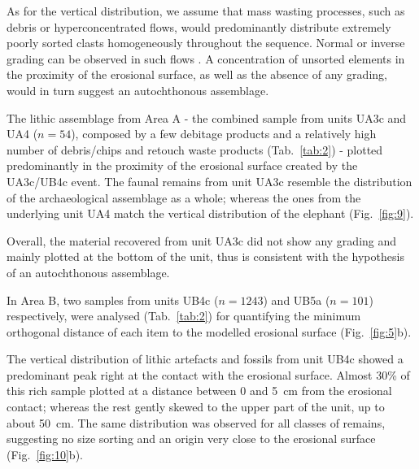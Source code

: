 \documentclass[preprint,authoryear,times]{elsarticle} %
\begin{document}

As for the vertical distribution, we assume that mass wasting processes, such as debris or hyperconcentrated flows, would predominantly distribute extremely poorly sorted clasts homogeneously throughout the sequence. Normal or inverse grading can be observed in such flows \citep{Pierson2005}. A concentration of unsorted elements in the proximity of the erosional surface, as well as the absence of any grading, would in turn suggest an autochthonous assemblage.


The lithic assemblage from Area A - the combined sample from units UA3c and UA4 ($n = 54$), composed by a few debitage products and a relatively high number of debris/chips and retouch waste products (Tab.~\ref{tab:2}) - plotted predominantly in the proximity of the erosional surface created by the UA3c/UB4c event. The faunal remains from unit UA3c resemble the distribution of the archaeological assemblage as a whole; whereas the ones from the underlying unit UA4 match the vertical distribution of the elephant (Fig.~\ref{fig:9}).

Overall, the material recovered from unit UA3c did not show any grading and mainly plotted at the bottom of the unit, thus is consistent with the hypothesis of an autochthonous assemblage.


In Area B, two samples from units UB4c ($n = 1243$) and UB5a ($n = 101$) respectively, were analysed (Tab.~\ref{tab:2}) for quantifying the minimum orthogonal distance of each item to the modelled erosional surface (Fig.~\ref{fig:5}b).

The vertical distribution of lithic artefacts and fossils from unit UB4c showed a predominant peak right at the contact with the erosional surface. Almost 30\% of this rich sample plotted at a distance between 0 and 5~cm from the erosional contact; whereas the rest gently skewed to the upper part of the unit, up to about 50~cm. The same distribution was observed for all classes of remains, suggesting no size sorting and an origin very close to the erosional surface (Fig.~\ref{fig:10}b).
\end{document}
